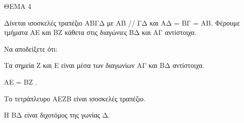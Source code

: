 
ΘΕΜΑ 4

Δίνεται ισοσκελές τραπέζιο ΑΒΓΔ με ΑΒ // ΓΔ και ΑΔ = ΒΓ = ΑΒ. Φέρουμε τμήματα ΑΕ και ΒΖ κάθετα στις διαγώνιες ΒΔ και ΑΓ αντίστοιχα.

Να αποδείξετε ότι:

\begin{alist}
\item Τα σημεία Ζ και Ε είναι μέσα των διαγωνίων ΑΓ και ΒΔ αντίστοιχα. 

\item ΑΕ = ΒΖ . 

\item Το τετράπλευρο ΑΕΖΒ είναι ισοσκελές τραπέζιο. 

\item Η ΒΔ είναι διχοτόμος της γωνίας Δ. 


\end{alist}
